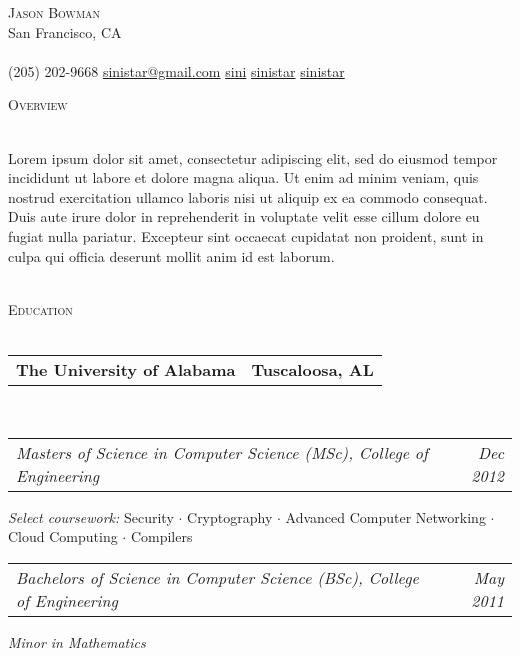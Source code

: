 \documentclass[10pt,letterpaper]{article}
\makeatletter
\newcommand{\area}[2]{\emph{#1:}   #2}
\newcommand{\lineunder}{\vspace*{-8pt} \\ \hspace*{-18pt} \hrulefill \\}
\newcommand{\header}[1]{{\hspace*{-15pt}\vspace*{6pt} \textsc{#1}} \vspace*{-6pt} \lineunder}
\newcommand{\contact}[3]{
\vspace*{-8pt}
\begin{center}
{\LARGE \scshape {#1}}\\
#2 \lineunder 
#3
\end{center}
\vspace*{-8pt}
}
\newcommand{\headerrow}[2]
{\begin{tabular*}{\linewidth}{l@{\extracolsep{\fill}}r}
	#1 &
	#2 \\
\end{tabular*}}
\newcommand{\education}[5]{
	\headerrow
		{\textbf{#1}}
		{\textbf{#2}}
	\\
	\headerrow
		{\emph{#3}}
		{\emph{#4}}
    #5
}
\makeatother
\begin{document}
\small
\smallskip
\vspace*{-30pt}

\contact{Jason Bowman}
{San Francisco, CA}
{\faPhone \hspace{0.1em} (205) 202-9668 \hspace{0.1em} \faEnvelope \hspace{0.1em}
  \href{mailto:sinistar@gmail.com}{sinistar@gmail.com} \hspace{0.1em} \faGithub \hspace{0.1em} \href{https://www.github.com/sini}{sini} \hspace{0.1em} \faTwitter
  \hspace{0.1em} \href{https://www.twitter.com/sinistar}{sinistar} \hspace{0.1em} \faLinkedin \hspace{0.1em}
  \href{https://linkedin.com/in/sinistar}{sinistar}}

\vspace*{3pt}

\header{Overview}
\begin{overview}\setlength{\parindent}{15pt}
Lorem ipsum dolor sit amet, consectetur adipiscing elit, sed do eiusmod tempor incididunt ut labore et dolore magna aliqua. Ut enim ad minim veniam, quis nostrud exercitation ullamco laboris nisi ut aliquip ex ea commodo consequat. Duis aute irure dolor in reprehenderit in voluptate velit esse cillum dolore eu fugiat nulla pariatur. Excepteur sint occaecat cupidatat non proident, sunt in culpa qui officia deserunt mollit anim id est laborum.
\end{overview}
\\
\vspace*{3pt}
\header{Education}
\education{The University of Alabama}{Tuscaloosa, AL}{Masters of Science in
  Computer Science (MSc), College of Engineering}{Dec 2012}{
	\begin{itemize*}
		\item \area{Select
    coursework}{Security $\cdot$ Cryptography $\cdot$ Advanced Computer
    Networking $\cdot$ Cloud Computing $\cdot$ Compilers}
	\end{itemize*}
	\headerrow{\emph{Bachelors of Science in Computer Science (BSc), College of
      Engineering}}{\emph{May 2011}}
	\begin{itemize*}
  \item \emph{Minor in Mathematics}
	\end{itemize*}
}

\end{document}
